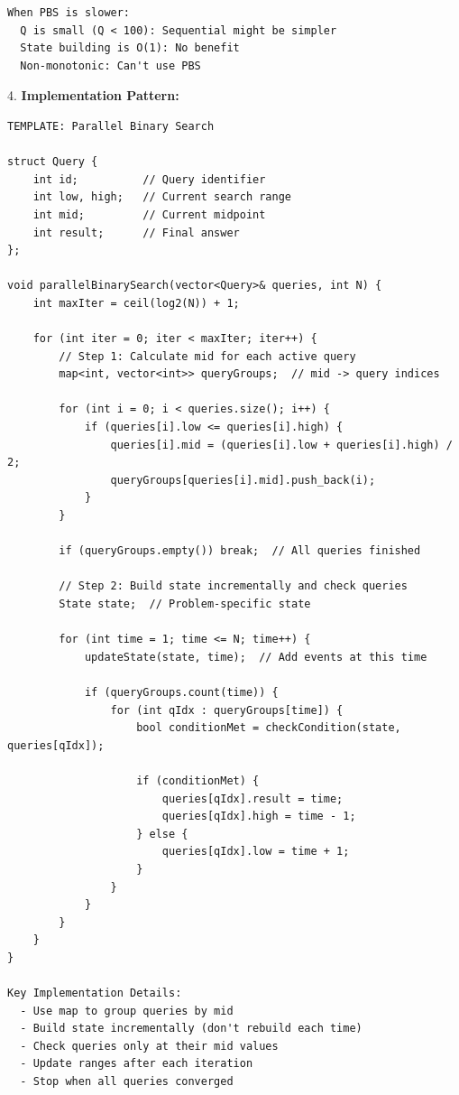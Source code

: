 \documentclass[11pt,a4paper,oneside]{book}
\begin{document}
\begin{tcolorbox}[
    enhanced,breakable,
    colback=white,
    colframe=deepblue,
    boxrule=1.5pt,
    arc=3mm,
    title=\textbf{The Offline Processing Paradigm}
]
\begin{verbatim}
When PBS is slower:
  Q is small (Q < 100): Sequential might be simpler
  State building is O(1): No benefit
  Non-monotonic: Can't use PBS
\end{verbatim}

4. \textbf{Implementation Pattern:}
\begin{verbatim}
TEMPLATE: Parallel Binary Search

struct Query {
    int id;          // Query identifier
    int low, high;   // Current search range
    int mid;         // Current midpoint
    int result;      // Final answer
};

void parallelBinarySearch(vector<Query>& queries, int N) {
    int maxIter = ceil(log2(N)) + 1;
    
    for (int iter = 0; iter < maxIter; iter++) {
        // Step 1: Calculate mid for each active query
        map<int, vector<int>> queryGroups;  // mid -> query indices
        
        for (int i = 0; i < queries.size(); i++) {
            if (queries[i].low <= queries[i].high) {
                queries[i].mid = (queries[i].low + queries[i].high) / 2;
                queryGroups[queries[i].mid].push_back(i);
            }
        }
        
        if (queryGroups.empty()) break;  // All queries finished
        
        // Step 2: Build state incrementally and check queries
        State state;  // Problem-specific state
        
        for (int time = 1; time <= N; time++) {
            updateState(state, time);  // Add events at this time
            
            if (queryGroups.count(time)) {
                for (int qIdx : queryGroups[time]) {
                    bool conditionMet = checkCondition(state, queries[qIdx]);
                    
                    if (conditionMet) {
                        queries[qIdx].result = time;
                        queries[qIdx].high = time - 1;
                    } else {
                        queries[qIdx].low = time + 1;
                    }
                }
            }
        }
    }
}

Key Implementation Details:
  - Use map to group queries by mid
  - Build state incrementally (don't rebuild each time)
  - Check queries only at their mid values
  - Update ranges after each iteration
  - Stop when all queries converged
\end{verbatim}


\end{tcolorbox}
\end{document}
